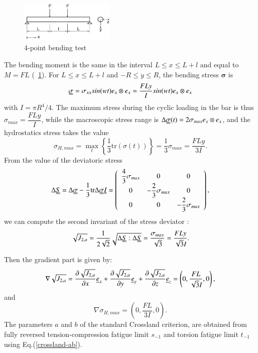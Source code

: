 \documentclass[3p,times,procedia,number]{elsarticle}
\newcommand{\figref}[1]{\figurename~\ref{#1}}
\begin{document}
\begin{figure}[h!]
	\centering
	\includegraphics[width=0.4\textwidth]{figures//fig11.jpg} 
	\caption{4-point bending test \cite{Papadopoulos1996513} }
	\label{fig11}
\end{figure}

The bending moment is the same in the interval $L\leqslant x \leqslant L+l$ and equal to
$M = FL$ (\figref{fig11}).
For $L\leqslant x \leqslant L+l$ and  $-R\leqslant y \leqslant R$, the bending stress $\bm{\sigma}$  is
\begin{equation}
\uuline{\sigma}=\sigma_{xx}sin(wt)e_x\otimes e_x=\dfrac{FLy}{I}sin(wt) e_x\otimes e_x \label{bending4} \end{equation}
with $I=\pi R^4/4$.  The maximum stress during the cyclic loading in the bar  is thus 
$ \sigma_{max}=\dfrac{FLy}{I}$, 
while the macroscopic stress range is $ \Delta\uuline{\sigma}(t)=2\sigma_{max}e_x\otimes e_x $, and the 
hydrostatics stress takes the value
\begin{equation}
\sigma_{H,max}=\max\limits_{t}\left\lbrace \dfrac{1}{3}\textrm{tr}(\sigma(t))\right\rbrace =\dfrac{1}{3}\sigma_{max}=\dfrac{FLy}{3I}.
\end{equation}
From the value of  the deviatoric stress
\begin{equation} 
\Delta\uuline{ S}=\Delta\uuline{\sigma}-\dfrac{1}{3}\textrm{tr}\Delta\uuline{\sigma}\uuline{I}=
\left(
\begin{array}{ccc}
\dfrac{4}{3}\sigma_{max} & 0 & 0\\
0 & -\dfrac{2}{3}\sigma_{max} & 0\\ 
0 & 0 & -\dfrac{2}{3}\sigma_{max}\\
\end{array}\right) ,
\end{equation}
we can compute the second invariant of the stress deviator :
\begin{equation}
\sqrt{J_{2,a}}=\dfrac{1}{2\sqrt{2}}\sqrt{\Delta \uuline{S}:\Delta \uuline{S}}=\dfrac{\sigma_{max}}{\sqrt{3}} =\dfrac{FLy}{\sqrt{3}I} .
\end{equation}


Then the gradient part is given by:
\begin{equation}
\nabla\sqrt{J_{2,a}}=\dfrac{\partial\sqrt{J_{2,a}}}{\partial x}\uline{e}_x+\dfrac{\partial\sqrt{J_{2,a}}}{\partial y}\uline{e}_y+\dfrac{\partial\sqrt{J_{2,a}}}{\partial z}\uline{e}_z=\left( 0,\dfrac{FL}{\sqrt{3}I},0\right)  ,
\end{equation}
and
\begin{equation}
\nabla \sigma_{H,max}=(0,\dfrac{FL}{3I},0).
\end{equation}
The parameters $a$ and $b$ of the standard Crossland criterion, are obtained from fully reversed tension-compression fatigue limit $s_{-1}$  and torsion fatigue limit $t_{-1}$ using Eq.(\ref{crossland-ab}).
\end{document}

